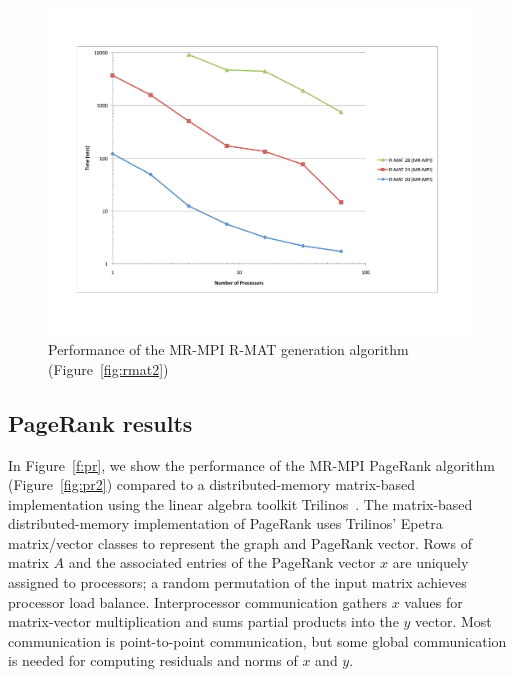 \begin{figure}[htb]
\includegraphics[width=\textwidth]{fig_rmat.pdf}
\caption{Performance of the MR-MPI R-MAT generation algorithm (Figure~\ref{fig:rmat2}) 
}
\label{f:rmat}
\end{figure}

\subsection{PageRank results}
\label{subsec:results_pagerank}

In Figure~\ref{f:pr}, we show the performance of the MR-MPI PageRank algorithm
(Figure~\ref{fig:pr2}) compared to a
distributed-memory matrix-based implementation using the linear
algebra toolkit Trilinos~\cite{Trilinos-Overview}.
The matrix-based distributed-memory implementation of PageRank
uses Trilinos' Epetra matrix/vector classes to represent the graph and
PageRank vector.
Rows of matrix $A$ and the associated entries of the PageRank vector $x$
are uniquely assigned to processors; a random permutation of the input
matrix achieves processor load balance.
Interprocessor communication gathers $x$ values for matrix-vector
multiplication and sums partial products into the $y$ vector.
Most communication is point-to-point communication,
but some global communication is needed for computing
residuals and norms of $x$ and $y$.

